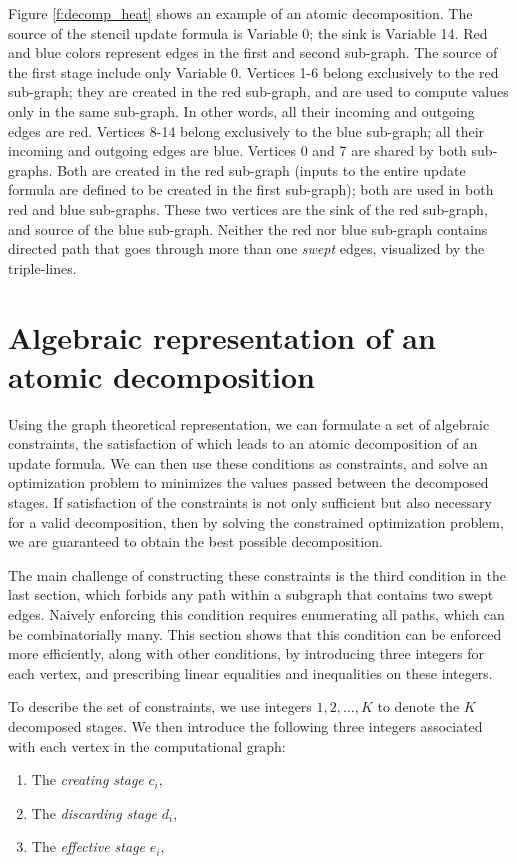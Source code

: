 \documentclass[review]{siamart0216}
\begin{document}
Figure \ref{f:decomp_heat} shows an example of an atomic decomposition.
The source of the stencil update formula is Variable 0; the sink is Variable 14.
Red and blue colors represent edges in the first and second sub-graph.
The source of the first stage include only Variable 0.
Vertices 1-6 belong exclusively to the red sub-graph; they are created in
the red sub-graph, and are used to compute values only in the same
sub-graph.  In other words, all their incoming and outgoing edges are red.
Vertices 8-14 belong exclusively to the blue sub-graph; all their incoming
and outgoing edges are blue.  Vertices 0 and 7 are shared by both sub-graphs.
Both are created in the red sub-graph (inputs to the entire update formula
are defined to be created in the first sub-graph); both are used in both
red and blue sub-graphs.  These two vertices are the sink of the red sub-graph,
and source of the blue sub-graph.
Neither the red nor blue sub-graph contains directed path
that goes through more than one {\it swept} edges, visualized by the
triple-lines.

\section{Algebraic representation of an atomic decomposition}

Using the graph theoretical representation, we can formulate
a set of algebraic constraints, the satisfaction of which leads to
an atomic decomposition of an update formula.  We can then use these
conditions as constraints, and solve an optimization problem to
minimizes the values passed between the decomposed stages.
If satisfaction of the constraints is not only sufficient but also necessary
for a valid decomposition, then by solving the constrained optimization
problem, we are guaranteed to obtain the best possible decomposition.

The main challenge of constructing these constraints is the third condition
in the last section, which forbids any path within a subgraph that contains
two swept edges.  Naively enforcing this condition requires enumerating all
paths, which can be combinatorially many.  This section shows that this
condition can be enforced more efficiently, along with other conditions,
by introducing three integers for each vertex, and prescribing linear
equalities and inequalities on these integers.

To describe the set of constraints,
we use integers $1,2,\ldots,K$ to denote the $K$ decomposed stages.
We then introduce the following three integers associated with each vertex
in the computational graph:
\begin{enumerate}
    \item The {\it creating stage} $c_i$,
    \item The {\it discarding stage} $d_i$,
    \item The {\it effective stage} $e_i$,
\end{enumerate}
\end{document}
